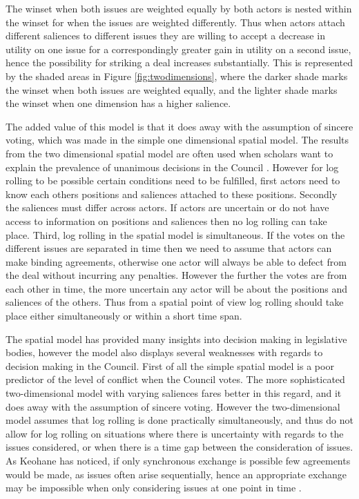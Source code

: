 The winset when both issues are weighted equally by both actors is nested within the winset for when the issues are weighted differently. Thus when actors attach different saliences to different issues they are willing to accept a decrease in utility on one issue for a correspondingly greater gain in utility on a second issue, hence the possibility for striking a deal increases substantially. This is represented by the shaded areas in Figure \ref{fig:twodimensions}, where the darker shade marks the winset when both issues are weighted equally, and the lighter shade marks the winset when one dimension has a higher salience. 

The added value of this model is that it does away with the assumption of sincere voting, which was made in the simple one dimensional spatial model. The results from the two dimensional spatial model are often used when scholars want to explain the prevalence of unanimous decisions in the Council \citep{MattilaLane2001,KonigJunge2009}. However for log rolling to be possible certain conditions need to be fulfilled, first actors need to know each others positions and saliences attached to these positions. Secondly the saliences must differ across actors. If actors are uncertain or do not have access to information on positions and saliences then no log rolling can take place. Third, log rolling in the spatial model is simultaneous. If the votes on the different issues are separated in time then we need to assume that actors can make binding agreements, otherwise one actor will always be able to defect from the deal without incurring any penalties. However the further the votes are from each other in time, the more uncertain any actor will be about the positions and saliences of the others. Thus from a spatial point of view log rolling should take place either simultaneously or within a short time span. 

The spatial model has provided many insights into decision making in legislative bodies, however the model also displays several weaknesses with regards to decision making in the Council.  First of all the simple spatial model is a poor predictor of the level of conflict when the Council votes. The more sophisticated two-dimensional model with varying saliences fares better in this regard, and it does away with the assumption of sincere voting. However the two-dimensional model assumes that log rolling is done practically simultaneously, and thus do not allow for log rolling on situations where there is uncertainty with regards to the issues considered, or when there is a time gap between the consideration of issues. As Keohane has noticed, if only synchronous exchange is possible few agreements would be made, as issues often arise sequentially, hence an appropriate exchange may be impossible when only considering issues at one point in time \citep[21]{Keohane1986}. 

